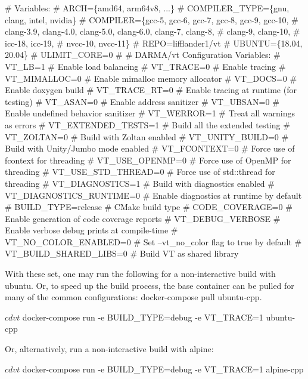 \begin{DoxyCode}
# Variables:
#   ARCH=\{amd64, arm64v8, ...\}
#   COMPILER\_TYPE=\{gnu, clang, intel, nvidia\}
#   COMPILER=\{gcc-5, gcc-6, gcc-7, gcc-8, gcc-9, gcc-10,
#             clang-3.9, clang-4.0, clang-5.0, clang-6.0, clang-7, clang-8,
#             clang-9, clang-10,
#             icc-18, icc-19,
#             nvcc-10, nvcc-11\}
#   REPO=lifflander1/vt
#   UBUNTU=\{18.04, 20.04\}
#   ULIMIT\_CORE=0
#
# DARMA/vt Configuration Variables:
#   VT\_LB=1                   # Enable load balancing
#   VT\_TRACE=0                # Enable tracing
#   VT\_MIMALLOC=0             # Enable mimalloc memory allocator
#   VT\_DOCS=0                 # Enable doxygen build
#   VT\_TRACE\_RT=0             # Enable tracing at runtime (for testing)
#   VT\_ASAN=0                 # Enable address sanitizer
#   VT\_UBSAN=0                # Enable undefined behavior sanitizer
#   VT\_WERROR=1               # Treat all warnings as errors
#   VT\_EXTENDED\_TESTS=1       # Build all the extended testing
#   VT\_ZOLTAN=0               # Build with Zoltan enabled
#   VT\_UNITY\_BUILD=0          # Build with Unity/Jumbo mode enabled
#   VT\_FCONTEXT=0             # Force use of fcontext for threading
#   VT\_USE\_OPENMP=0           # Force use of OpenMP for threading
#   VT\_USE\_STD\_THREAD=0       # Force use of std::thread for threading
#   VT\_DIAGNOSTICS=1          # Build with diagnostics enabled
#   VT\_DIAGNOSTICS\_RUNTIME=0  # Enable diagnostics at runtime by default
#   BUILD\_TYPE=release        # CMake build type
#   CODE\_COVERAGE=0           # Enable generation of code coverage reports
#   VT\_DEBUG\_VERBOSE          # Enable verbose debug prints at compile-time
#   VT\_NO\_COLOR\_ENABLED=0     # Set --vt\_no\_color flag to true by default
#   VT\_BUILD\_SHARED\_LIBS=0    # Build VT as shared library
\end{DoxyCode}


With these set, one may run the following for a non-\/interactive build with ubuntu. Or, to speed up the build process, the base container can be pulled for many of the common configurations\+: {\ttfamily docker-\/compose pull ubuntu-\/cpp}.


\begin{DoxyCode}
$ cd vt
$ docker-compose run -e BUILD\_TYPE=debug -e VT\_TRACE=1 ubuntu-cpp
\end{DoxyCode}


Or, alternatively, run a non-\/interactive build with alpine\+:


\begin{DoxyCode}
$ cd vt
$ docker-compose run -e BUILD\_TYPE=debug -e VT\_TRACE=1 alpine-cpp
\end{DoxyCode}


